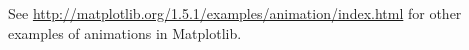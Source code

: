 See \url{http://matplotlib.org/1.5.1/examples/animation/index.html} for other examples of animations in Matplotlib.


